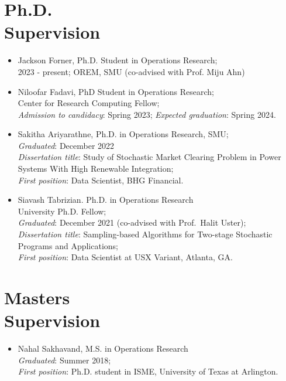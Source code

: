 \documentclass[hyperref, margin]{myResume}
\begin{document}
\begin{resume}
\section{Ph.D. \\Supervision}
	\begin{itemize}[leftmargin=*]
		\item Jackson Forner, Ph.D. Student in Operations Research;\\
		2023 - present; OREM, SMU (co-advised with Prof. Miju Ahn)

		\item Niloofar Fadavi, PhD Student in Operations Research; \\
		Center for Research Computing Fellow; \\
		\emph{Admission to candidacy}: Spring 2023;
		\emph{Expected graduation}: Spring 2024.
		
		\item Sakitha Ariyarathne, Ph.D. in Operations Research, SMU;\\
		\emph{Graduated}: December 2022\\
		\emph{Dissertation title}: Study of Stochastic Market Clearing Problem in Power Systems With High Renewable Integration;\\
		\emph{First position}: Data Scientist, BHG Financial.

		\item Siavash Tabrizian. Ph.D. in Operations Research \\
		University Ph.D. Fellow;\\
		\emph{Graduated}: December 2021 (co-advised with Prof.\ Halit Uster);\\
		\emph{Dissertation title}: Sampling-based Algorithms for Two-stage Stochastic Programs and Applications;\\
		\emph{First position}: Data Scientist at USX Variant, Atlanta, GA.
	\end{itemize}

	\vspace{-0.2cm}
\section{Masters \\Supervision}
	\begin{itemize}[leftmargin=*]\itemsep0em
		\item Nahal Sakhavand, M.S. in Operations Research\\		
		\emph{Graduated}: Summer 2018;\\ 
		\emph{First position}: Ph.D. student in ISME, University of Texas at Arlington.
	\end{itemize}
	\vspace{-0.2cm}	
	

\end{resume}
\end{document}
